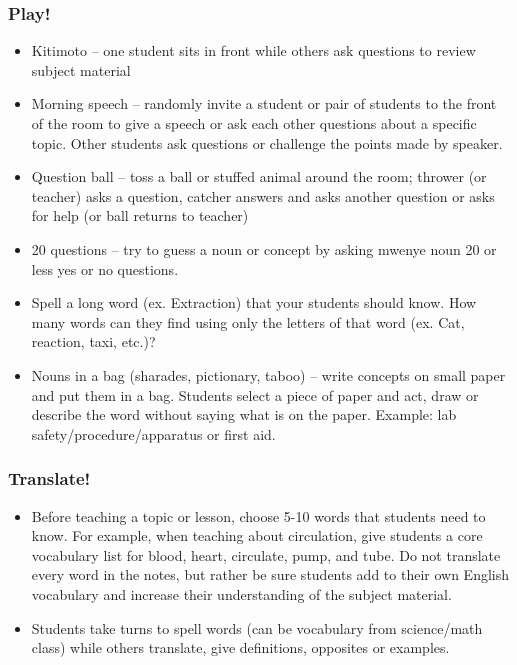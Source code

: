 \documentclass[12pt,a4paper]{report}
\begin{document}
\subsubsection{Play!} 
\begin{itemize}
\item{Kitimoto – one student sits in front while others ask questions to review subject material}

\item{Morning speech – randomly invite a student or pair of students to the front of the room to give a speech or ask each other questions about a specific topic. Other students ask questions or challenge the points made by speaker.}

\item{Question ball – toss a ball or stuffed animal around the room; thrower (or teacher) asks a question, catcher answers and asks another question or asks for help (or ball returns to teacher)}

\item{20 questions – try to guess a noun or concept by asking mwenye noun 20 or less yes or no questions.}

\item{Spell a long word (ex. Extraction) that your students should know. How many words can they find using only the letters of that word (ex. Cat, reaction, taxi, etc.)?}

\item{Nouns in a bag (sharades, pictionary, taboo) – write concepts on small paper and put them in a bag. Students select a piece of paper and act, draw or describe the word without saying what is on the paper. Example: lab safety/procedure/apparatus or first aid.}
\end{itemize}

\subsubsection{Translate!}
\begin{itemize}
\item{Before teaching a topic or lesson, choose 5-10 words that students need to know. For example, when teaching about circulation, give students a core vocabulary list for blood, heart, circulate, pump, and tube. Do not translate every word in the notes, but rather be sure students add to their own English vocabulary and increase their understanding of the subject material.}

\item{Students take turns to spell words (can be vocabulary from science/math class) while others translate, give definitions, opposites or examples.}

\end{itemize}
\end{document}
